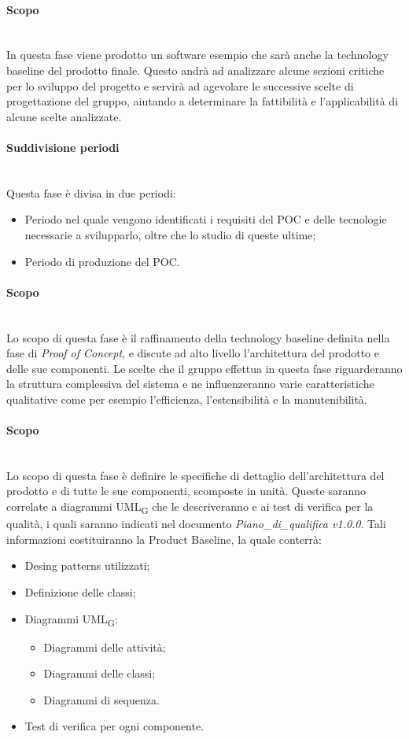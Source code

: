 	\paragraph {Scopo}\mbox{}\\
	In questa fase viene prodotto un software esempio che sarà anche la technology baseline del prodotto finale. Questo andrà ad analizzare alcune sezioni critiche per lo sviluppo del progetto e servirà ad agevolare le successive scelte di progettazione del gruppo, aiutando a determinare la fattibilità e l'applicabilità di alcune scelte analizzate.
	\paragraph {Suddivisione periodi}\mbox{}\\
	Questa fase è divisa in due periodi:
	\begin{itemize}
		\item Periodo nel quale vengono identificati i requisiti del POC e delle 	tecnologie necessarie a svilupparlo, oltre che lo studio di queste ultime;
		\item Periodo di produzione del POC.
	\end{itemize}
	\paragraph {Scopo}\mbox{}\\
	Lo scopo di questa fase è il raffinamento della technology baseline definita nella fase di \textit{Proof of Concept}, e discute ad alto livello l'architettura del prodotto e delle sue componenti. Le scelte che il gruppo effettua in questa fase riguarderanno la struttura complessiva del sistema e ne influenzeranno varie caratteristiche qualitative come per esempio l'efficienza, l'estensibilità e la manutenibilità.
	\paragraph {Scopo}\mbox{}\\
	Lo scopo di questa fase è definire le specifiche di dettaglio dell’architettura del prodotto e di tutte le sue componenti, scomposte in unità. Queste saranno correlate a diagrammi UML\textsubscript{G} che le descriveranno e ai test di verifica per la qualità, i quali saranno indicati nel documento \textit{Piano\_di\_qualifica v1.0.0}. Tali informazioni costituiranno la Product Baseline, la quale conterrà:
	\begin{itemize}
		\item Desing patterns utilizzati;
		\item Definizione delle classi;
		\item Diagrammi UML\textsubscript{G}:
		\begin{itemize}
			\item Diagrammi delle attività;
			\item Diagrammi delle classi;
			\item Diagrammi di sequenza.
		\end{itemize}
		\item Test di verifica per ogni componente.
	\end{itemize}
